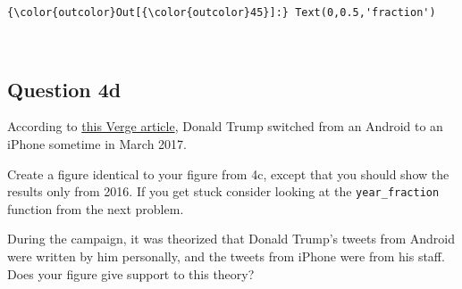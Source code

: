 \documentclass[11pt]{article}
\begin{document}
\begin{Verbatim}[commandchars=\\\{\}]
{\color{outcolor}Out[{\color{outcolor}45}]:} Text(0,0.5,'fraction')
\end{Verbatim}
            
    \begin{center}
    \end{center}
    { \hspace*{\fill} \\}
    
    \subsection{Question 4d}\label{question-4d}

According to
\href{https://www.theverge.com/2017/3/29/15103504/donald-trump-iphone-using-switched-android}{this
Verge article}, Donald Trump switched from an Android to an iPhone
sometime in March 2017.

Create a figure identical to your figure from 4c, except that you should
show the results only from 2016. If you get stuck consider looking at
the \texttt{year\_fraction} function from the next problem.

During the campaign, it was theorized that Donald Trump's tweets from
Android were written by him personally, and the tweets from iPhone were
from his staff. Does your figure give support to this theory?
\end{document}
